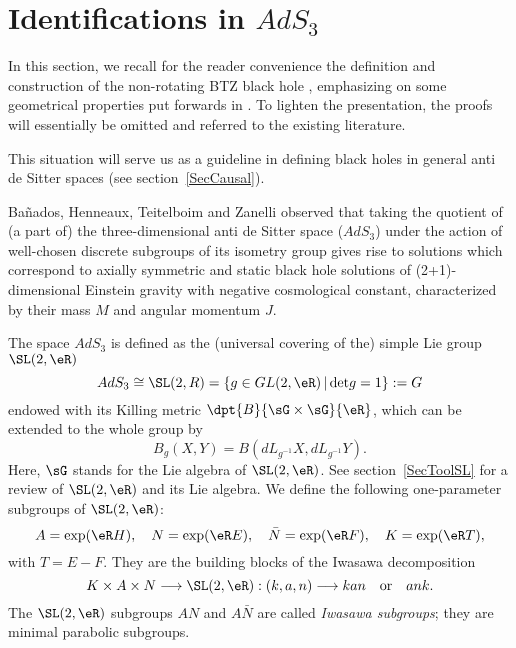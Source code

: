 \section{Identifications in \texorpdfstring{$AdS_3$}{AdS3}}\label{secBTZ}

In this section, we recall for the reader convenience the definition and construction of the non-rotating BTZ black hole \cite{BTZ_un,BTZ_deux}, emphasizing on some geometrical properties put forwards in \cite{BTZB_un,BDRS,Keio,Clement}. To lighten the presentation, the proofs will essentially be omitted and referred to the existing literature.

This situation will serve us as a guideline in defining black holes in general anti de Sitter spaces (see section~\ref{SecCausal}).

Ba\~nados, Henneaux, Teitelboim and Zanelli observed that taking the quotient of (a part of) the three-dimensional anti de Sitter space ($AdS_3$) under the action of well-chosen discrete subgroups of its isometry group gives rise to solutions which correspond to axially symmetric and static black hole solutions of (2+1)-dimensional Einstein gravity with negative cosmological constant, characterized by their mass $M$ and angular momentum $J$.

The space $AdS_3$ is defined as the (universal covering of the) simple Lie group $\SL(2,\eR)$
\begin{equation}\label{AdS3}
	AdS_3 \cong \SL(2,R) = \{g \in GL(2,\eR) \, | \, \mbox{det} g = 1 \}:= G
\end{equation}
endowed with its Killing metric $\dpt{B}{\sG\times\sG}{\eR}$, which can be extended to the whole group by
\begin{equation}
	B_g(X,Y)=B(dL_{g^{-1}}X,dL_{g^{-1}}Y).
\end{equation}
Here, $\sG$ stands for the Lie algebra of $\SL(2,\eR)$. See section~\ref{SecToolSL} for a review of $\SL(2,\eR)$ and its Lie algebra. We define the following one-parameter subgroups of $\SL(2,\eR)$:
\begin{equation}\label{IwasawaSubgroups}
	A = \exp(\eR H), \quad  N = \exp(\eR E), \quad \bar{N}=\exp(\eR
	F), \quad K=\exp(\eR T),
\end{equation}
with $T=E-F$. They are the building blocks of the Iwasawa decomposition
\begin{equation}
	K \times A \times N \longrightarrow \SL(2,\eR): (k,a,n)
	\longrightarrow kan \quad \mbox{or} \quad ank.
\end{equation}
The $\SL(2,\eR)$ subgroups $AN$ and $A\bar{N}$ are called \emph{Iwasawa subgroups}; they are minimal parabolic subgroups.

